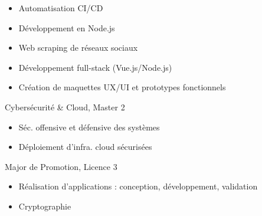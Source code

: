 \documentclass[10pt,a4paper,ragged2e,withhyper]{altacv}
\begin{document}
\begin{paracol}{2}
\divider

\begin{itemize}
    \item Automatisation CI/CD
    \item Développement en Node.js
    \item Web scraping de réseaux sociaux
\end{itemize}

\divider

\begin{itemize}
    \item Développement full-stack (Vue.js/Node.js)
    \item Création de maquettes UX/UI et prototypes fonctionnels
\end{itemize}


\switchcolumn



\divider



{\faLock} Cybersécurité \& Cloud, Master 2\break
\begin{itemize}
    \item Séc. offensive et défensive des systèmes
    \item Déploiement d'infra. cloud sécurisées
\end{itemize}

\divider

{\faTrophy} Major de Promotion, Licence 3\break
\begin{itemize}
    \item Réalisation d'applications : conception, développement, validation
    \item Cryptographie
\end{itemize}


\end{paracol}
\end{document}

